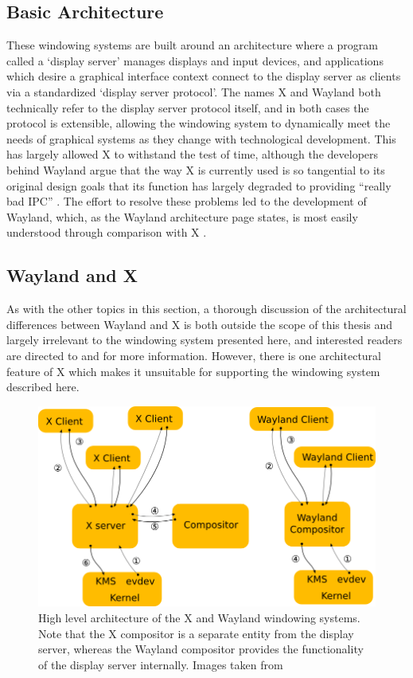 \subsection{Basic Architecture}

These windowing systems are built around an architecture where a program called a ‘display server’ manages displays and input devices, and applications which desire a graphical interface context connect to the display server as clients via a standardized ‘display server protocol’. The names X and Wayland both technically refer to the display server protocol itself, and in both cases the protocol is extensible, allowing the windowing system to dynamically meet the needs of graphical systems as they change with technological development. This has largely allowed X to withstand the test of time, although the developers behind Wayland argue that the way X is currently used is so tangential to its original design goals that its function has largely degraded to providing “really bad IPC” \cite{real-story-wayland}. The effort to resolve these problems led to the development of Wayland, which, as the Wayland architecture page states, is most easily understood through comparison with X \cite{wayland}.

\subsection{Wayland and X}

As with the other topics in this section, a thorough discussion of the architectural differences between Wayland and X is both outside the scope of this thesis and largely irrelevant to the windowing system presented here, and interested readers are directed to \cite{wayland} and \cite{real-story-wayland} for more information. However, there is one architectural feature of X which makes it unsuitable for supporting the windowing system described here.

\begin{figure}[ht!]
\centering
\includegraphics[width=1.0\textwidth]{images/wayland-x-architecture.png}
\caption{High level architecture of the X and Wayland windowing systems. Note that the X compositor is a separate entity from the display server, whereas the Wayland compositor provides the functionality of the display server internally. Images taken from  \protect\cite{wayland}}
\label{wayland-vs-x}
\end{figure}



